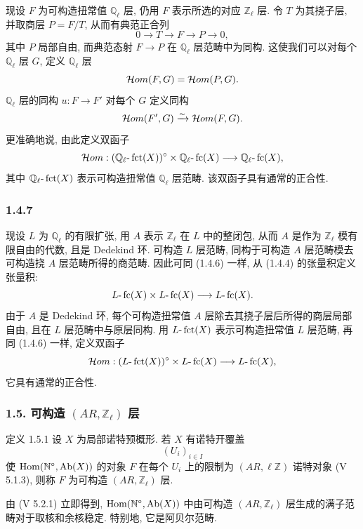 现设 \(F\) 为可构造扭常值 \(\mathbb Q_\ell\) 层, 仍用 \(F\) 表示所选的对应 \(\mathbb Z_\ell\) 层. 令 \(T\) 为其挠子层, 并取商层 \(P=F/T\), 从而有典范正合列
\[
0\longrightarrow T\longrightarrow F\longrightarrow P\longrightarrow0,
\]
其中 \(P\) 局部自由, 而典范态射 \(F\to P\) 在 \(\mathbb Q_\ell\) 层范畴中为同构. 这使我们可以对每个 \(\mathbb Q_\ell\) 层 \(G\), 定义 \(\mathbb Q_\ell\) 层
\[
\mathcal{H}om(F,G)=\mathcal{H}om(P,G).
\]
\(\mathbb Q_\ell\) 层的同构 \(u:F\to F'\) 对每个 \(G\) 定义同构
\[
\mathcal{H}om(F',G)\xrightarrow{\sim}\mathcal{H}om(F,G).
\]
更准确地说, 由此定义双函子
\[
\mathcal{H}om:(\mathbb Q_\ell\text{-}\operatorname{fct}(X))^\circ\times \mathbb Q_\ell\text{-}\operatorname{fc}(X)
\longrightarrow \mathbb Q_\ell\text{-}\operatorname{fc}(X),
\]
其中 \(\mathbb Q_\ell\text{-}\operatorname{fct}(X)\) 表示可构造扭常值 \(\mathbb Q_\ell\) 层范畴. 该双函子具有通常的正合性.

\subsubsection*{1.4.7}
现设 \(L\) 为 \(\mathbb Q_\ell\) 的有限扩张, 用 \(A\) 表示 \(\mathbb Z_\ell\) 在 \(L\) 中的整闭包, 从而 \(A\) 是作为 \(\mathbb Z_\ell\) 模有限自由的代数, 且是 Dedekind 环. 可构造 \(L\) 层范畴, 同构于可构造 \(A\) 层范畴模去可构造挠 \(A\) 层范畴所得的商范畴. 因此可同 (1.4.6) 一样, 从 (1.4.4) 的张量积定义张量积:
\[
L\text{-}\operatorname{fc}(X)\times L\text{-}\operatorname{fc}(X)\longrightarrow L\text{-}\operatorname{fc}(X).
\]
由于 \(A\) 是 Dedekind 环, 每个可构造扭常值 \(A\) 层除去其挠子层后所得的商层局部自由, 且在 \(L\) 层范畴中与原层同构. 用 \(L\text{-}\operatorname{fct}(X)\) 表示可构造扭常值 \(L\) 层范畴, 再同 (1.4.6) 一样, 定义双函子
\[
\mathcal{H}om:(L\text{-}\operatorname{fct}(X))^\circ\times L\text{-}\operatorname{fc}(X)
\longrightarrow L\text{-}\operatorname{fc}(X),
\]
它具有通常的正合性.

\subsubsection*{1.5. 可构造 \((AR,\mathbb Z_\ell)\) 层}

\begin{statement}{定义 1.5.1}
设 \(X\) 为局部诺特预概形. 若 \(X\) 有诺特开覆盖
\[
(U_i)_{i\in I}
\]
使 \(\operatorname{Hom}(\mathbb N^\circ,\operatorname{Ab}(X))\) 的对象 \(F\) 在每个 \(U_i\) 上的限制为 \((AR,\ell\mathbb Z)\) 诺特对象 (V 5.1.3), 则称 \(F\) 为可构造 \((AR,\mathbb Z_\ell)\) 层.
\end{statement}

由 (V 5.2.1) 立即得到, \(\operatorname{Hom}(\mathbb N^\circ,\operatorname{Ab}(X))\) 中由可构造 \((AR,\mathbb Z_\ell)\) 层生成的满子范畴对于取核和余核稳定. 特别地, 它是阿贝尔范畴.

